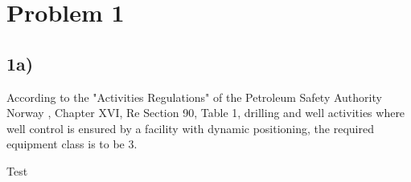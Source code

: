 \newpage
\section*{Problem 1}
\subsection*{1a)} \label{problem_1a}


According to the "Activities Regulations" of the Petroleum Safety Authority Norway \cite{Petroleum_Authority}, Chapter XVI, Re Section 90, Table 1, drilling and well activities where well control is ensured by a facility with dynamic positioning, the required equipment class is to be 3.  

\begin{comment}

\cite{Petroleum_Authority}

Chapter XVI - Maritime Operations
Section 90 - Positioning
Table 1 Equipment Class

d) Drilling and well activities: Where well control is ensured by a facility with dynamic positioning: Class 3

The equipment class is described in the IMO/MSC Circular 645, Chapter 2, Equipment Classes.

2.9 Functional requirements
In order to meet the single failure criteria it will normally be necessary to provide:
1) For equipment class 2 - redundancy of all active components.

2) For equipment class 3 - redundancy of all components and physical separation of the components.
\end{comment}




Test \cite{instance1290}